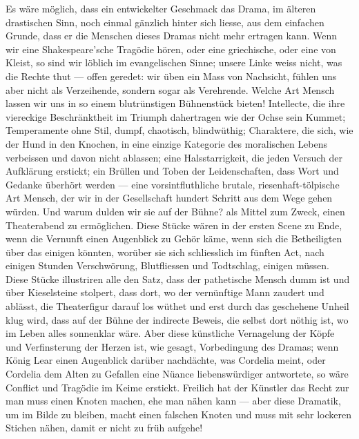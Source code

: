 Es wäre möglich, dass ein entwickelter Geschmack das Drama, im älteren drastischen Sinn, noch einmal gänzlich hinter sich liesse, aus dem einfachen Grunde, dass er die Menschen dieses Dramas nicht mehr ertragen kann. Wenn wir eine Shakespeare’sche Tragödie hören, oder eine griechische, oder eine von Kleist, so sind wir löblich im evangelischen Sinne; unsere Linke weiss nicht, was die Rechte thut — offen geredet: wir üben ein Mass von Nachsicht, fühlen uns aber nicht als Verzeihende, sondern sogar als Verehrende. Welche Art Mensch lassen wir uns in so einem blutrünstigen Bühnenstück bieten! Intellecte, die ihre viereckige Beschränktheit im Triumph dahertragen wie der Ochse sein Kummet; Temperamente ohne Stil, dumpf, chaotisch, blindwüthig; Charaktere, die sich, wie der Hund in den Knochen, in eine einzige Kategorie des moralischen Lebens verbeissen und davon nicht ablassen; eine Halsstarrigkeit, die jeden Versuch der Aufklärung erstickt; ein Brüllen und Toben der Leidenschaften, dass Wort und Gedanke überhört werden — eine vorsintfluthliche brutale, riesenhaft-tölpische Art Mensch, der wir in der Gesellschaft hundert Schritt aus dem Wege gehen würden. Und warum dulden wir sie auf der Bühne? als Mittel zum Zweck, einen Theaterabend zu ermöglichen. Diese Stücke wären in der ersten Scene zu Ende, wenn die Vernunft einen Augenblick zu Gehör käme, wenn sich die Betheiligten über das einigen könnten, worüber sie sich schliesslich im fünften Act, nach einigen Stunden Verschwörung, Blutfliessen und Todtschlag, einigen müssen. Diese Stücke illustriren alle den Satz, dass der pathetische Mensch dumm ist und über Kieselsteine stolpert, dass dort, wo der vernünftige Mann  zaudert und ablässt, die Theaterfigur darauf los wüthet und erst durch das geschehene Unheil klug wird, dass auf der Bühne der indirecte Beweis, die  selbst dort nöthig ist, wo im Leben alles sonnenklar wäre. Aber diese künstliche Vernagelung der Köpfe und Verfinsterung der Herzen ist, wie gesagt, Vorbedingung des Dramas; wenn König Lear einen Augenblick darüber nachdächte, was Cordelia meint, oder Cordelia dem Alten zu Gefallen eine Nüance liebenswürdiger antwortete, so wäre Conflict und Tragödie im Keime erstickt. Freilich hat der Künstler das Recht zur  man muss einen Knoten machen, ehe man nähen kann — aber diese Dramatik, um im Bilde zu bleiben, macht einen falschen Knoten und muss mit sehr lockeren Stichen nähen, damit er nicht zu früh aufgehe!
\par

